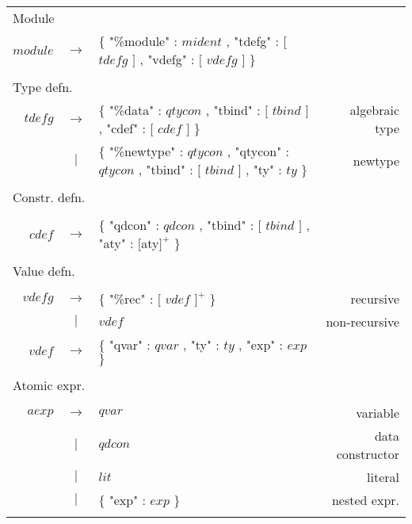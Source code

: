 \begin{footnotesize}
\begin{longtable}{ r c l r }

\\[0.01in]
\multicolumn{4}{l}{Module}		\\
$module$	& $ \rightarrow $ 	& $\{$ "\%module" : $mident$ , "tdefg" : $[$ $tdefg$ $]$ , "vdefg" : $[$ $vdefg$ $]$ $\}$			&			\\
\\[0.01in]

\multicolumn{4}{l}{Type defn.}		\\
$tdefg$ 	& $ \rightarrow $	& $\{$ "\%data" : $qtycon$ , "tbind" : $[$ $tbind$ $]$, "cdef" : $[$ $cdef$ $]$ $\}$							& algebraic type	\\
		& $ | $			& $\{$ "\%newtype" : $qtycon$ , "qtycon" : $qtycon$ , "tbind" : $[$ $tbind$ $]$ , "ty" : $ty$ $\}$ 		& newtype		\\
\\[0.01in]

\multicolumn{4}{l}{Constr. defn.}	\\
\\[0.01in]
$cdef$		& $ \rightarrow $	& $\{$ "qdcon" : $qdcon$ , "tbind" : $[$ $tbind$ $ ]$ , "aty" : $[$aty$]^{+}$ $\}$ 				& 			\\
\\[0.01in]

\multicolumn{4}{l}{Value defn.}		\\
\\[0.01in]
$vdefg$		& $ \rightarrow $	& $\{$ "\%rec" : $[$ $vdef$ $]^{+}$ $\}$    									& recursive		\\
		& $ | $			& $vdef$													& non-recursive		\\
$vdef$ 		& $ \rightarrow $	& $\{$ "qvar" : $qvar$ , "ty" : $ty$ , "exp" : $exp$ $\}$ 							& 			\\
\\[0.01in]

\multicolumn{4}{l}{Atomic expr.}	\\
\\[0.01in]
$aexp$		& $ \rightarrow $	& $qvar$													& variable		\\
		& $ | $			& $qdcon$													& data constructor	\\
		& $ | $			& $lit$														& literal		\\
		& $ | $			& $\{$ "exp" : $exp$ $\}$ 											& nested expr.		\\
\\[0.01in]


\end{longtable}
\end{footnotesize}
